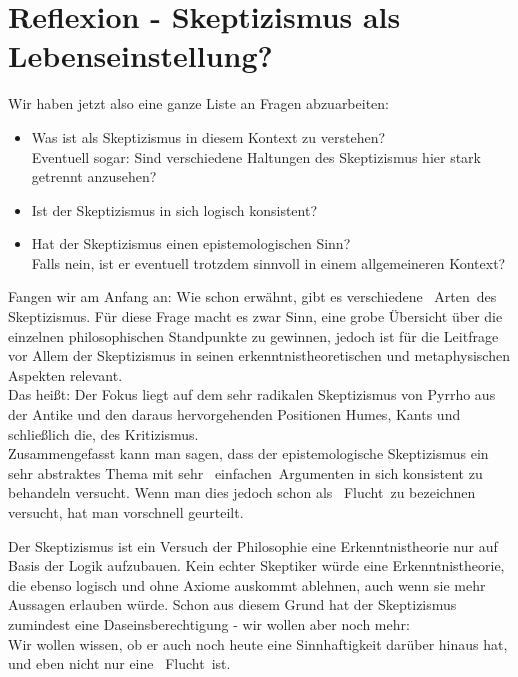 \documentclass[11pt,a4paper]{article}
\begin{document}
\section{Reflexion - Skeptizismus als Lebenseinstellung?}
Wir haben jetzt also eine ganze Liste an Fragen abzuarbeiten:
\begin{itemize}
\item Was ist als Skeptizismus in diesem Kontext zu verstehen?\\
Eventuell sogar: Sind verschiedene Haltungen des Skeptizismus hier stark getrennt anzusehen?
\item Ist der Skeptizismus in sich logisch konsistent?
\item Hat der Skeptizismus einen epistemologischen Sinn?\\
Falls nein, ist er eventuell trotzdem sinnvoll in einem allgemeineren Kontext?
\end{itemize}

Fangen wir am Anfang an: Wie schon erwähnt, gibt es verschiedene \glqq\ Arten\grqq\  des Skeptizismus. Für diese Frage macht es zwar Sinn, eine grobe Übersicht über die einzelnen philosophischen Standpunkte zu gewinnen, jedoch ist für die Leitfrage vor Allem der Skeptizismus in seinen erkenntnistheoretischen und metaphysischen Aspekten relevant.\\
Das heißt: Der Fokus liegt auf dem sehr radikalen Skeptizismus von Pyrrho aus der Antike und den daraus hervorgehenden Positionen Humes, Kants und schließlich die, des Kritizismus.\\
Zusammengefasst kann man sagen, dass der epistemologische Skeptizismus ein sehr abstraktes Thema mit sehr \glqq\ einfachen\grqq\ Argumenten in sich konsistent zu behandeln versucht. Wenn man dies jedoch schon als \glqq\ Flucht\grqq\ zu bezeichnen versucht, hat man vorschnell geurteilt.

Der Skeptizismus ist ein Versuch der Philosophie eine Erkenntnistheorie nur auf Basis der Logik aufzubauen. Kein echter Skeptiker würde eine Erkenntnistheorie, die ebenso logisch und ohne Axiome auskommt ablehnen, auch wenn sie mehr Aussagen erlauben würde. Schon aus diesem Grund hat der Skeptizismus zumindest eine Daseinsberechtigung - wir wollen aber noch mehr:\\
Wir wollen wissen, ob er auch noch heute eine Sinnhaftigkeit darüber hinaus hat,  und eben nicht nur eine \glqq\ Flucht\grqq\ ist.
\end{document}
